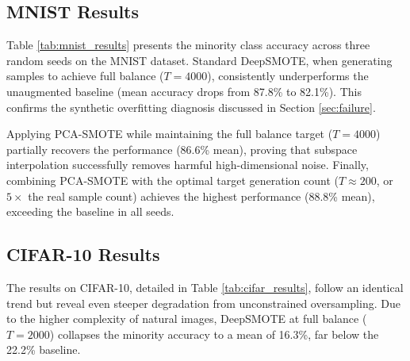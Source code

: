 \documentclass[5p,times]{elsarticle}
\begin{document}
\subsection{MNIST Results}
\label{subsec:mnist}
Table \ref{tab:mnist_results} presents the minority class accuracy across three random seeds on the MNIST dataset. Standard DeepSMOTE, when generating samples to achieve full balance ($T=4000$), consistently underperforms the unaugmented baseline (mean accuracy drops from 87.8\% to 82.1\%). This confirms the synthetic overfitting diagnosis discussed in Section \ref{sec:failure}.

Applying PCA-SMOTE while maintaining the full balance target ($T=4000$) partially recovers the performance (86.6\% mean), proving that subspace interpolation successfully removes harmful high-dimensional noise. Finally, combining PCA-SMOTE with the optimal target generation count ($T \approx 200$, or $5\times$ the real sample count) achieves the highest performance (88.8\% mean), exceeding the baseline in all seeds.

\begin{table}[htbp]
    \centering
    \caption{MNIST minority class (Digit 9) accuracy (\%) across three random seeds.}
    \label{tab:mnist_results}
\end{table}

\subsection{CIFAR-10 Results}
\label{subsec:cifar}
The results on CIFAR-10, detailed in Table \ref{tab:cifar_results}, follow an identical trend but reveal even steeper degradation from unconstrained oversampling. Due to the higher complexity of natural images, DeepSMOTE at full balance ($T=2000$) collapses the minority accuracy to a mean of 16.3\%, far below the 22.2\% baseline. 
\end{document}
